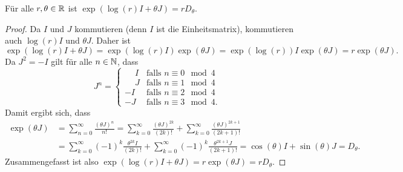 \documentclass[a4paper, 10pt, numbers=noenddot]{scrartcl}
\begin{document}
\begin{lemma}\label{lem: finding a logarithm for rotation matrices}
  Für alle $r, \theta \in \mathbb{R}$ ist $\exp(\log(r) I + \theta J) = r D_{\theta}$.
\end{lemma}
\begin{proof}
  Da $I$ und $J$ kommutieren (denn $I$ ist die Einheitsmatrix), kommutieren auch $\log(r) I$ und $\theta J$.
  Daher ist
  \[
      \exp(\log(r) I + \theta J)
    = \exp(\log(r) I) \exp(\theta J)
    = \exp(\log(r)) I \exp(\theta J)
    = r \exp(\theta J).
  \]
  Da $J^2 = -I$ gilt für alle $n \in \mathbb{N}$, dass
  \[
    J^n
    =
    \begin{cases}
      \phantom{-}I  & \text{falls $n \equiv 0 \mod 4$}  \\
      \phantom{-}J  & \text{falls $n \equiv 1 \mod 4$}  \\
                -I  & \text{falls $n \equiv 2 \mod 4$}  \\
                -J  & \text{falls $n \equiv 3 \mod 4$}.
    \end{cases}
  \]
  Damit ergibt sich, dass
  \begin{align*}
        \exp(\theta J)
    &=  \sum_{n=0}^\infty \frac{(\theta J)^n}{n!}
     =    \sum_{k=0}^\infty \frac{(\theta J)^{2k}}{(2k)!}
        + \sum_{k=0}^\infty \frac{(\theta J)^{2k+1}}{(2k+1)!}     \\
    &=    \sum_{k=0}^\infty (-1)^k \frac{\theta^{2k} I}{(2k)!}
        + \sum_{k=0}^\infty (-1)^k \frac{\theta^{2k+1} J}{(2k+1)!}
     =  \cos(\theta) I + \sin(\theta) J
     =  D_\theta.
  \end{align*}
  Zusammengefasst ist also $\exp(\log(r)I + \theta J) = r \exp(\theta J) = r D_\theta$.
\end{proof}
\end{document}
